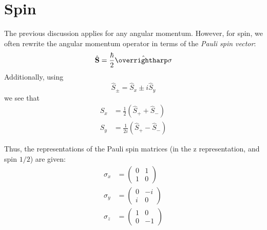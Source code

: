 \section{Spin}
The previous discussion applies for any angular momentum. However, for spin, we often rewrite the angular momentum operator in terms of the \emph{Pauli spin vector}:
\begin{equation}
	\hat{\vb{S}} = \frac{\hbar}{2}\hat{\vv{\sigma}}
\end{equation}
Additionally, using 
\begin{equation}
	\hat S_\pm  =\hat S_x \pm i \hat S_y
\end{equation}
we see that
\begin{subequations}
	\begin{align}
		S_x & =\frac{1}{2}\left(\hat S_+  + \hat S_-\right)\\
		S_y & =\frac{1}{2i}\left(\hat S_+  - \hat S_-\right)
	\end{align}	
\end{subequations}

Thus, the representations of the Pauli spin matrices (in the z representation, and spin \(1/2\)) are given:
\begin{subequations}
	\begin{align}
		\sigma_x & = \begin{pmatrix}
			0&1\\1&0
		\end{pmatrix}\\
		\sigma_y & = \begin{pmatrix}
			0 & -i \\ i & 0
		\end{pmatrix}\\
		\sigma_z & = \begin{pmatrix}
			1&0\\0&-1
		\end{pmatrix}
	\end{align}
\end{subequations}

